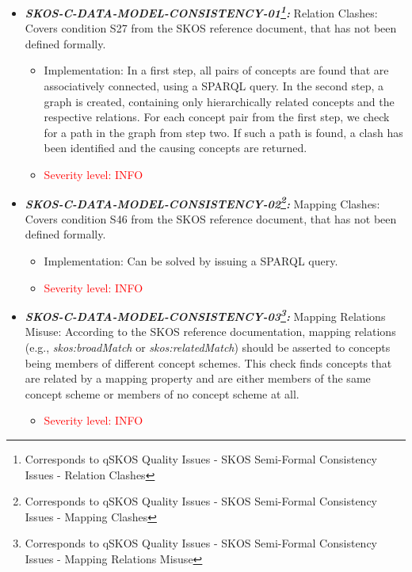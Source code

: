 \documentclass{llncs}
\begin{document}
\begin{itemize}

	\item \textbf{{\em SKOS-C-DATA-MODEL-CONSISTENCY-01\footnote{Corresponds to qSKOS Quality Issues - SKOS Semi-Formal Consistency Issues - Relation Clashes}:}}
	Relation Clashes:
  Covers condition S27 from the SKOS reference document, that has not been defined formally. 
	\begin{itemize}
	  \item Implementation:
		In a first step, all pairs of concepts are found that are associatively connected, using a SPARQL query. In the second step, a graph is created, containing only hierarchically related concepts and the respective relations. For each concept pair from the first step, we check for a path in the graph from step two. If such a path is found, a clash has been identified and the causing concepts are returned. 
		\item \textcolor{red}{Severity level: INFO} 
	\end{itemize}
	
	\item \textbf{{\em SKOS-C-DATA-MODEL-CONSISTENCY-02\footnote{Corresponds to qSKOS Quality Issues - SKOS Semi-Formal Consistency Issues - Mapping Clashes}:}}
	Mapping Clashes:
  Covers condition S46 from the SKOS reference document, that has not been defined formally. 
	\begin{itemize}
	  \item Implementation:
		Can be solved by issuing a SPARQL query. 
		\item \textcolor{red}{Severity level: INFO} 
	\end{itemize}
	
	\item \textbf{{\em SKOS-C-DATA-MODEL-CONSISTENCY-03\footnote{Corresponds to qSKOS Quality Issues - SKOS Semi-Formal Consistency Issues - Mapping Relations Misuse}:}}
	Mapping Relations Misuse:
  According to the SKOS reference documentation, mapping relations (e.g., \emph{skos:broadMatch} or \emph{skos:relatedMatch}) should be asserted to concepts being members of different concept schemes. This check finds concepts that are related by a mapping property and are either members of the same concept scheme or members of no concept scheme at all. 
	\begin{itemize}
		\item \textcolor{red}{Severity level: INFO} 
	\end{itemize}
	
\end{itemize}
\end{document}
